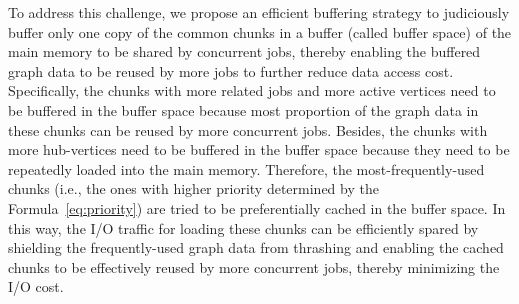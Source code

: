 \documentclass[10pt,journal,compsoc]{IEEEtran}
\begin{document}
\begin{table}[!t]
	\renewcommand{\arraystretch}{1.15}
	\caption{Proprieties of Graph Datasets}\label{T2}
	\vspace{-0.35cm}
	\centering
	\small
	\vspace{-12pt}
\end{table}

To address this challenge, we propose an efficient buffering strategy to judiciously buffer only one copy of the common chunks in a buffer (called buffer space) of the main memory to be shared by concurrent jobs, thereby enabling the buffered graph data to be reused by more jobs to further reduce data access cost. Specifically, the chunks with more related jobs and more active vertices need to be buffered in the buffer space because most proportion of the graph data in these chunks can be reused by more concurrent jobs.
Besides, the chunks with more hub-vertices need to be buffered in the buffer space because they need to be repeatedly loaded into the main memory.
Therefore, the most-frequently-used chunks (i.e., the ones with higher priority determined by the Formula~\eqref{eq:priority}) are tried to be preferentially cached in the buffer space.
In this way, the I/O traffic for loading these chunks can be efficiently spared by shielding the frequently-used graph data from thrashing and enabling the cached chunks to be effectively reused by more concurrent jobs, thereby minimizing the I/O cost.

\end{document}
